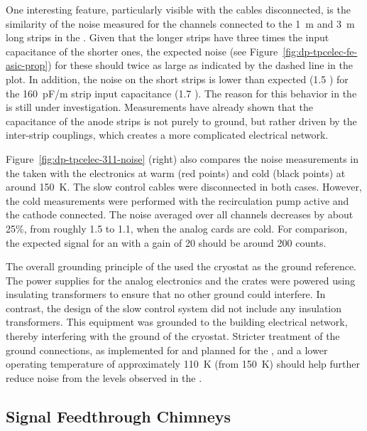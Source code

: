 One interesting feature, particularly visible with the cables disconnected, is the similarity of the noise measured for the channels connected to the \SI{1}{\meter} and \SI{3}{\meter} long strips in the . Given that the longer strips have three times the input capacitance of the shorter ones, the expected noise (see Figure~\ref{fig:dp-tpcelec-fe-asic-prop}) for these should twice as large as indicated by the dashed line in the plot. In addition, the noise on the short strips is lower than expected (\num{1.5} ) for the \SI{160}{pF/m} strip input capacitance (\num{1.7} ). The reason for this behavior in the  is still under investigation. Measurements have already shown that the capacitance of the  anode strips is not purely to ground, but rather driven by the inter-strip couplings, which creates a more complicated electrical network. 

Figure~\ref{fig:dp-tpcelec-311-noise} (right) also compares the noise measurements in the  taken with the  electronics at warm (red points) and cold (black points) at around \SI{150}{\kelvin}. The slow control cables were disconnected in both cases. However, the cold measurements were performed with the recirculation pump active and the cathode  connected. The \rms noise averaged over all channels decreases by about 25\%, from roughly \SI{1.5}{} to \SI{1.1}{}, when the  analog cards are cold. For comparison, the expected signal for an  with a  gain of \num{20} should be around \SI{200}{} counts. 

The overall grounding principle of the  used the cryostat as the ground reference. The  power supplies for the  analog electronics and the  crates were powered using insulating transformers to ensure that no other ground could interfere. In contrast, the design of the slow control system did not include any insulation transformers. This equipment was grounded to the building electrical network, thereby interfering with the ground of the cryostat. Stricter treatment of the ground connections, as implemented for  and planned for the , and a lower  operating temperature of approximately \SI{110}{\kelvin} (from \SI{150}{\kelvin}) should help further reduce noise from the levels observed in the .


\subsection{Signal Feedthrough Chimneys}
\label{ssec:dp-tpcelec-design-sft}


